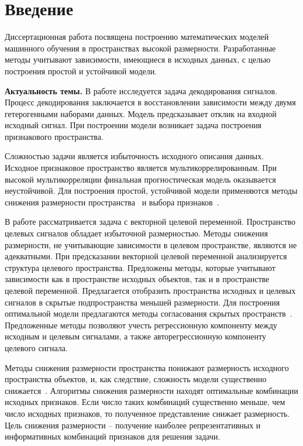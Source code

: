 \chapter*{Введение}

Диссертационная работа посвящена построению математических моделей машинного обучения в пространствах высокой размерности.
Разработанные методы учитывают зависимости, имеющиеся в исходных данных, с целью построения простой и устойчивой модели.

\textbf{Актуальность темы.} 
В работе исследуется задача декодирования сигналов. 
Процесс декодирования заключается в восстановлении зависимости между двумя гетерогенными наборами данных.
Модель предсказывает отклик на входной исходный сигнал.
При построении модели возникает задача построения признакового пространства. 

Сложностью задачи является избыточность исходного описания данных. 
Исходное признаковое пространство является мультикоррелированным.
При высокой мультикорреляции финальная прогностическая модель оказывается неустойчивой.
Для построения простой, устойчивой модели применяются методы снижения размерности пространства~\cite{motrenko2018multi,chun2010sparse,mehmood2012review}  и выбора признаков~\cite{katrutsa2017comprehensive,li2017feature}.

В работе рассматривается задача с векторной целевой переменной. 
Пространство целевых сигналов обладает избыточной размерностью. 
Методы снижения размерности, не учитывающие зависимости в целевом пространстве, являются не адекватными.
При предсказании векторной целевой переменной анализируется структура целевого пространства.
Предложены методы, которые учитывают зависимости как в пространстве исходных объектов, так и в пространстве целевой переменной.
Предлагается отобразить пространства исходных и целевых сигналов в скрытые подпространства меньшей размерности.
Для построения оптимальной модели предлагаются методы согласования скрытых пространств~\cite{wold1975path,rosipal2005overview,eliseyev2017recursive}.
Предложенные методы позволяют учесть регрессионную компоненту между исходным и целевым сигналами, а также авторегрессионную компоненту целевого сигнала.

Методы снижения размерности пространства понижают размерность исходного пространства объектов, и, как следствие, сложность модели существенно снижается~\cite{tipping1999probabilisticpca,wold1975path,hotelling1992relations}. 
Алгоритмы снижения размерности находят оптимальные комбинации исходных признаков. 
Если число таких комбинаций существенно меньше, чем число исходных признаков, то полученное представление снижает размерность.
Цель снижения размерности -- получение наиболее репрезентативных и информативных комбинаций признаков для решения задачи.

